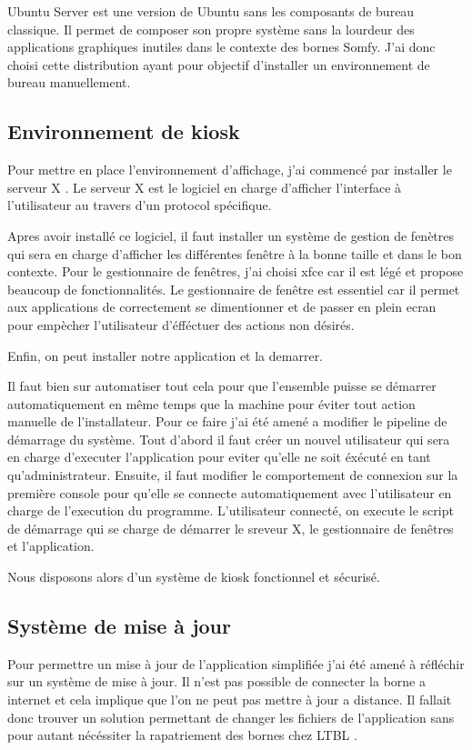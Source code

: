 Ubuntu Server est une version de Ubuntu sans les composants de bureau classique.
Il permet de composer son propre système sans la lourdeur des applications graphiques inutiles dans le contexte des bornes Somfy.
J'ai donc choisi cette distribution ayant pour objectif d'installer un environnement de bureau manuellement.

\subsection{Environnement de kiosk}

Pour mettre en place l'environnement d'affichage, j'ai commencé par installer le serveur X .
Le serveur X est le logiciel en charge d'afficher l'interface à l'utilisateur au travers d'un protocol spécifique.

Apres avoir installé ce logiciel, il faut installer un système de gestion de fenètres qui sera en charge d'afficher les différentes fenêtre à la bonne taille et dans le bon contexte.
Pour le gestionnaire de fenêtres, j'ai choisi xfce car il est légé et propose beaucoup de fonctionnalités.
Le gestionnaire de fenêtre est essentiel car il permet aux applications de correctement se dimentionner et de passer en plein ecran pour empècher l'utilisateur d'éfféctuer des actions non désirés.

Enfin, on peut installer notre application et la demarrer.

Il faut bien sur automatiser tout cela pour que l'ensemble puisse se démarrer automatiquement en même temps que la machine pour éviter tout action manuelle de l'installateur.
Pour ce faire j'ai été amené a modifier le pipeline de démarrage du système.
Tout d'abord il faut créer un nouvel utilisateur qui sera en charge d'executer l'application pour eviter qu'elle ne soit éxécuté en tant qu'administrateur.
Ensuite, il faut modifier le comportement de connexion sur la première console pour qu'elle se connecte automatiquement avec l'utilisateur en charge de l'execution du programme.
L'utilisateur connecté, on execute le script de démarrage qui se charge de démarrer le sreveur X, le gestionnaire de fenêtres et l'application.

Nous disposons alors d'un système de kiosk fonctionnel et sécurisé.

\subsection{Système de mise à jour}

Pour permettre un mise à jour de l'application simplifiée j'ai été amené à réfléchir sur un système de mise à jour.
Il n'est pas possible de connecter la borne a internet et cela implique que l'on ne peut pas mettre à jour a distance.
Il fallait donc trouver un solution permettant de changer les fichiers de l'application sans pour autant nécéssiter la rapatriement des bornes chez LTBL .

